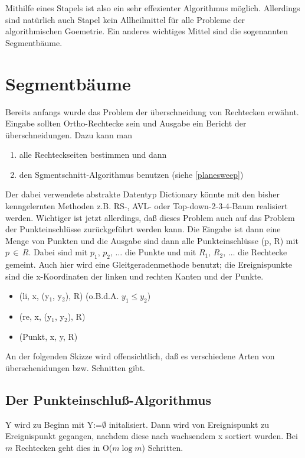 Mithilfe eines Stapels ist also ein sehr effezienter Algorithmus möglich. Allerdings sind natürlich auch Stapel kein Allheilmittel
für alle Probleme der algorithmischen Goemetrie. Ein anderes wichtiges Mittel sind die sogenannten Segmentbäume.

\section{Segmentbäume}
Bereits anfangs wurde das Problem der überschneidung von Rechtecken erwähnt. Eingabe sollten Ortho-Rechtecke sein und Ausgabe ein
Bericht der überschneidungen. Dazu kann man
\begin{enumerate}
\item alle Rechteckseiten bestimmen und dann
\item den Sgmentschnitt-Algorithmus benutzen (siehe \autoref{planesweep})
\end{enumerate}

Der dabei verwendete abstrakte Datentyp Dictionary könnte mit den bisher kenngelernten Methoden z.B. RS-, AVL- oder
Top-down-2-3-4-Baum realisiert werden.
Wichtiger ist jetzt allerdings, daß dieses Problem auch auf das Problem der Punkteinschlüsse zurückgeführt werden kann. Die Eingabe
ist dann eine Menge von Punkten und die Ausgabe sind dann alle Punkteinschlüsse (p, R) mit $p\, \in \,R$. Dabei sind mit $p_1, \, p_2,
\, \ldots$ die Punkte und mit $R_1, \, R_2, \, \ldots$ die Rechtecke gemeint. Auch hier wird eine Gleitgeradenmethode benutzt; die
Ereignispunkte sind die x-Koordinaten der linken und rechten Kanten und der Punkte.
\begin{itemize}
\item[] (li, x, (y$_1$, y$_2$), R) \hspace{2cm} (o.B.d.A. $y_1 \leq y_2$)\vspace{-0.5ex}
\item[] (re, x, (y$_1$, y$_2$), R) \vspace{-0.5ex}
\item[] (Punkt, x, y, R)
\end{itemize}

An der folgenden Skizze wird offensichtlich, daß es verschiedene Arten von überschenidungen bzw. Schnitten gibt. 
\begin{figure}[H]
\centering


\end{figure}

\subsection{Der Punkteinschluß-Algorithmus}
Y wird zu Beginn  mit Y:=$\emptyset$ initalisiert. Dann wird von Ereignispunkt zu Ereignispunkt gegangen, nachdem diese nach wachsendem
x sortiert wurden. Bei $m$ Rechtecken geht dies in O($m \log m$) Schritten.

